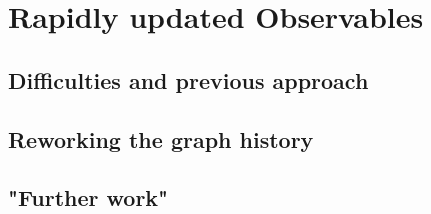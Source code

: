 \section{Rapidly updated Observables}
\label{sec:RapidlyUpdatedObservables}
	
	\subsection{Difficulties and previous approach}
	
	\subsection{Reworking the graph history}
	
	
	\subsection{"Further work"}

